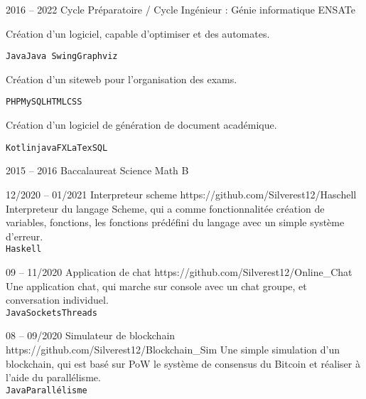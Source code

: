 \documentclass[10pt]{developercv} %
\begin{document}
\begin{entrylist}
	\entry
		{2016 -- 2022}
		{Cycle Pr\'eparatoire / Cycle Ing\'enieur : G\'enie informatique}
		{ENSATe}
	    {   {Cr\'eation d'un logiciel, capable d'optimiser et  des automates. 
            
            \texttt{Java}\slashsep\texttt{Java Swing}\slashsep\texttt{Graphviz}} 
            
            {Cr\'eation d'un siteweb pour l'organisation des exams. 
            
            \texttt{PHP}\slashsep\texttt{MySQL}\slashsep\texttt{HTML}\slashsep\texttt{CSS}}
            
            {Cr\'eation d'un logiciel de g\'en\'eration de document acad\'emique.
            
            \texttt{Kotlin}\slashsep\texttt{javaFX}\slashsep\texttt{LaTex}\slashsep\texttt{SQL}}
        }
	\entry
		{2015 -- 2016}
		{Baccalaureat Science Math B}
		{}
		{}
\end{entrylist}




\begin{entrylist}
	\entry
		{12/2020 -- 01/2021}
		{Interpreteur scheme}
		{https://github.com/Silverest12/Haschell}
        {Interpreteur du langage Scheme, qui a comme fonctionnalit\'ee
        cr\'eation de variables, fonctions, les fonctions pr\'ed\'efini
        du langage avec un simple syst\`eme d'erreur.\\ \texttt{Haskell}}

    \entry
		{09 -- 11/2020}
        {Application de chat}
		{https://github.com/Silverest12/Online\_Chat}
        {Une application chat, qui marche sur console avec un chat groupe,
        et conversation individuel.\\ \texttt{Java}\slashsep\texttt{Sockets}\slashsep\texttt{Threads}}

    \entry
		{08 -- 09/2020}
		{Simulateur de blockchain}
		{https://github.com/Silverest12/Blockchain\_Sim}
        {Une simple simulation d'un blockchain, qui est bas\'e sur PoW le syst\`eme
        de consensus du Bitcoin et r\'ealiser \`a l'aide du parall\'elisme.\\ 
        \texttt{Java}\slashsep\texttt{Parall\'elisme}}
\end{entrylist}
\end{document}
